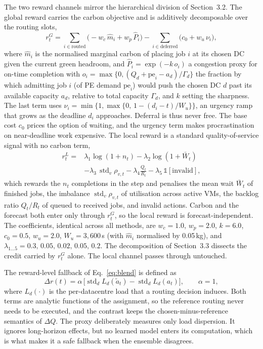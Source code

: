 The two reward channels mirror the hierarchical division of Section~3.2. The global reward carries the carbon objective and is additively decomposable over the routing slots,
\begin{equation}
r^{G}_t=\sum_{i\in\text{routed}}
\big(-w_c\,\hat{m}_i+w_p\,\hat{P}_i\big)
-\sum_{i\in\text{deferred}}\big(c_0+w_u\,\nu_i\big),
\label{eq:reward}
\end{equation}
where $\hat{m}_i$ is the normalised marginal carbon of placing job $i$ at its chosen DC given the current green headroom, and $\hat{P}_i=\exp(-k\,o_i)$ a congestion proxy for on-time completion with $o_i=\max\{0,(Q_d+\mathrm{pe}_i-a_d)/\Gamma_d\}$ the fraction by which admitting job $i$ (of PE demand $\mathrm{pe}_i$) would push the chosen DC $d$ past its available capacity $a_d$, relative to total capacity $\Gamma_d$, and $k$ setting the sharpness. The last term uses $\nu_i=\min\{1,\max\{0,\, 1-(d_i-t)/W_u\}\}$, an urgency ramp that grows as the deadline $d_i$ approaches. Deferral is thus never free. The base cost $c_0$ prices the option of waiting, and the urgency term makes procrastination on near-deadline work expensive. The local reward is a standard quality-of-service signal with no carbon term,
\begin{equation}
\begin{split}
r^{L}_t={} & \lambda_1\log(1{+}n_t)-\lambda_2\log(1{+}\bar{W}_t) \\
& -\lambda_3\,\operatorname{std}_v\rho_{v,t}-\lambda_4\frac{Q_t}{R_t}
-\lambda_5\,\mathds{1}[\text{invalid}],
\end{split}
\label{eq:localreward}
\end{equation}
which rewards the $n_t$ completions in the step and penalises the mean wait $\bar{W}_t$ of finished jobs, the imbalance $\operatorname{std}_v\rho_{v,t}$ of utilisation across active VMs, the backlog ratio $Q_t/R_t$ of queued to received jobs, and invalid actions. Carbon and the forecast both enter only through $r^{G}_t$, so the local reward is forecast-independent. The coefficients, identical across all methods, are $w_c{=}1.0$, $w_p{=}2.0$, $k{=}6.0$, $c_0{=}0.5$, $w_u{=}2.0$, $W_u{=}3{,}600$\,s (with $\hat m_i$ normalised by 0.05\,kg), and $\lambda_{1\ldots5}=0.3,\,0.05,\,0.02,\,0.05,\,0.2$. The decomposition of Section~3.3 dissects the credit carried by $r^{G}_t$ alone. The local channel passes through untouched.

The reward-level fallback of Eq.~\ref{eq:blend} is defined as
\begin{equation}
\Delta r(t)=\alpha\,\big[\operatorname{std}_d L_d(\tilde a_t)-\operatorname{std}_d L_d(a_t)\big],
\qquad \alpha=1,
\label{eq:deltar}
\end{equation}
where $L_d(\cdot)$ is the per-datacentre load that a routing decision induces. Both terms are analytic functions of the assignment, so the reference routing never needs to be executed, and the contrast keeps the chosen-minus-reference semantics of $\Delta Q$. The proxy deliberately measures only load dispersion. It ignores long-horizon effects, but no learned model enters its computation, which is what makes it a safe fallback when the ensemble disagrees.
